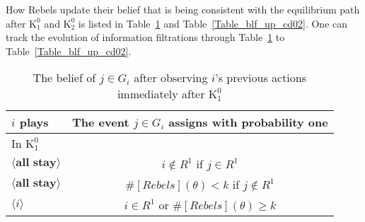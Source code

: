 \documentclass[12pt,letter]{article}
\newcommand{\Kappa}{\mathrm{K}}
\theoremstyle{definition}
\theoremstyle{remark}
\theoremstyle{claim}
\begin{document}
\clearpage

How Rebels update their belief that is being consistent with the equilibrium path after $\Kappa^0_1$ and $\Kappa^0_2$ is listed in Table~\ref{Table_blf_up_cd01} and Table~\ref{Table_blf_up_cd02}. One can track the evolution of information filtrations through Table~\ref{Table_blf_up_cd01} to Table~\ref{Table_blf_up_cd02}.

\begin{table}[!htbp]
\caption{The belief of $j\in G_i$ after observing $i$'s previous actions immediately after $\Kappa^0_{1}$}
\label{Table_blf_up_cd01}
\begin{center}
\begin{tabular}{l | c}
 	$i$ plays	  				  &  The event $j\in G_i$ assigns with probability one\\
\hline
\hline
In $\Kappa^0_{1}$	&				  \\
\hline
  $\langle \textbf{all stay} \rangle$	&    $i\notin R^1$ if $j\in R^1$ \\
  $\langle \textbf{all stay} \rangle$	&    $\#[Rebels](\theta)< k$ if $j\notin R^1$\\
  $\langle i \rangle$	&	  $i\in R^1$ or $\#[Rebels](\theta)\geq k$    \\
  \hline
\end{tabular}
\end{center}
\end{table}
\end{document}
